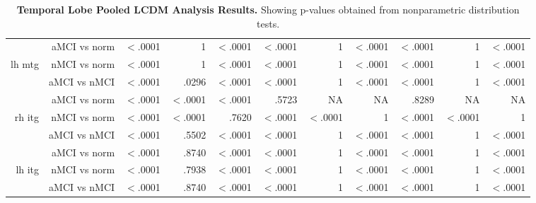 \documentclass[12pt]{article}\usepackage[]{graphicx}\usepackage[]{color}
\newcommand\T{\rule{0pt}{2.6ex}}
\begin{document}
\begin{sidewaystable}
\begin{tabular}{rr|rrr|rrr|rrr}
		& aMCI vs norm\T & $<$.0001 & 1 & $<$.0001 & $<$.0001 & 1 & $<$.0001 & $<$.0001 & 1 & $<$.0001 \\
		lh mtg & nMCI vs norm & $<$.0001 & 1 & $<$.0001 & $<$.0001 & 1  & $<$.0001 & $<$.0001 & 1 & $<$.0001 \\
		& aMCI vs nMCI & $<$.0001 & .0296 & $<$.0001 & $<$.0001 & 1 & $<$.0001 & $<$.0001 & 1 & $<$.0001 \\ \hline
		& aMCI vs norm\T &  $<$.0001 & $<$.0001 & $<$.0001 & .5723 & NA & NA & .8289 & NA & NA \\
		rh itg & nMCI vs norm & $<$.0001 & $<$.0001 & .7620 & $<$.0001 & $<$.0001 & 1 & $<$.0001 & $<$.0001 & 1 \\
		& aMCI vs nMCI & $<$.0001 & .5502 & $<$.0001 & $<$.0001 & 1 & $<$.0001 & $<$.0001 & 1 & $<$.0001 \\ \hline
		& aMCI vs norm\T &  $<$.0001 & .8740 & $<$.0001 &  $<$.0001 & 1 & $<$.0001 &  $<$.0001 & 1 & $<$.0001 \\
		lh itg & nMCI vs norm & $<$.0001 & .7938 & $<$.0001 & $<$.0001 & 1 & $<$.0001 & $<$.0001 & 1 & $<$.0001 \\
		& aMCI vs nMCI & $<$.0001 & .8740 & $<$.0001 & $<$.0001 & 1 & $<$.0001 & $<$.0001 & 1 & $<$.0001 \\
	\end{tabular}
	\caption{\textbf{Temporal Lobe Pooled LCDM Analysis Results.}  Showing p-values obtained from nonparametric distribution tests.}
	\label{Wave1.TL.nonpara}
\end{sidewaystable}
\end{document}
